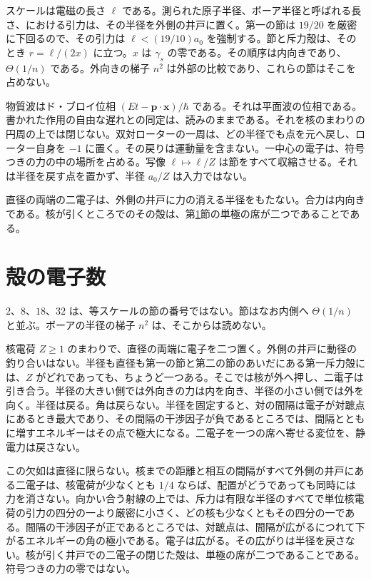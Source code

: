 \documentclass[a4paper]{article}
\begin{document}
スケールは電磁の長さ \(\ell\) である。測られた原子半径、ボーア半径と呼ばれる長さ、における引力は、その半径を外側の井戸に置く。第一の節は \(19/20\) を厳密に下回るので、その引力は \(\ell<(19/10)a_0\) を強制する。節と斥力殻は、そのとき \(r=\ell/(2x)\) に立つ。\(x\) は \(\gamma_s\) の零である。その順序は内向きであり、\(\Theta(1/n)\) である。外向きの梯子 \(n^{2}\) は外部の比較であり、これらの節はそこを占めない。

物質波はド・ブロイ位相 \((Et-\mathbf{p}\cdot\mathbf{x})/\hbar\) である。それは平面波の位相である。書かれた作用の自由な遅れとの同定は、読みのままである。それを核のまわりの円周の上では閉じない。双対ローターの一周は、どの半径でも点を元へ戻し、ローター自身を \(-1\) に置く。その戻りは運動量を含まない。一中心の電子は、符号つきの力の中の場所を占める。写像 \(\ell\mapsto\ell/Z\) は節をすべて収縮させる。それは半径を戻す点を置かず、半径 \(a_0/Z\) は入力ではない。

直径の両端の二電子は、外側の井戸に力の消える半径をもたない。合力は内向きである。核が引くところでのその殻は、第\ref{sec:shells}節の単極の席が二つであることである。

\section{殻の電子数}
\label{sec:shells}

\(2\)、\(8\)、\(18\)、\(32\) は、等スケールの節の番号ではない。節はなお内側へ \(\Theta(1/n)\) と並ぶ。ボーアの半径の梯子 \(n^{2}\) は、そこからは読めない。

核電荷 \(Z\ge 1\) のまわりで、直径の両端に電子を二つ置く。外側の井戸に動径の釣り合いはない。半径も直径も第一の節と第二の節のあいだにある第一斥力殻には、\(Z\) がどれであっても、ちょうど一つある。そこでは核が外へ押し、二電子は引き合う。半径の大きい側では外向きの力は内を向き、半径の小さい側では外を向く。半径は戻る。角は戻らない。半径を固定すると、対の間隔は電子が対蹠点にあるとき最大であり、その間隔の干渉因子が負であるところでは、間隔とともに増すエネルギーはその点で極大になる。二電子を一つの席へ寄せる変位を、静電力は戻さない。

この欠如は直径に限らない。核までの距離と相互の間隔がすべて外側の井戸にある二電子は、核電荷が少なくとも \(1/4\) ならば、配置がどうであっても同時には力を消さない。向かい合う射線の上では、斥力は有限な半径のすべてで単位核電荷の引力の四分の一より厳密に小さく、どの核も少なくともその四分の一である。間隔の干渉因子が正であるところでは、対蹠点は、間隔が広がるにつれて下がるエネルギーの角の極小である。電子は広がる。その広がりは半径を戻さない。核が引く井戸での二電子の閉じた殻は、単極の席が二つであることである。符号つきの力の零ではない。
\end{document}
